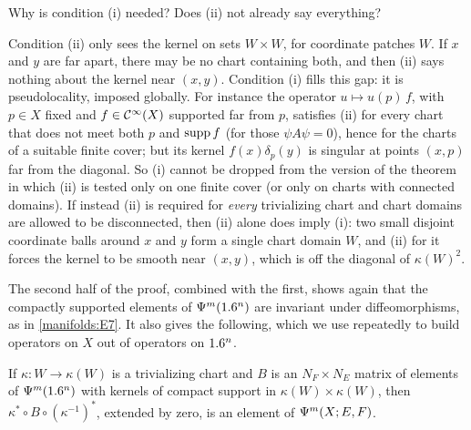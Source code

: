 \begin{question}
Why is condition (i) needed? Does (ii) not already say everything?
\end{question}
\begin{answer}
Condition (ii) only sees the kernel on sets $W\times W$, for coordinate
patches $W$. If $x$ and $y$ are far apart, there may be no chart containing
both, and then (ii) says nothing about the kernel near $(x,y)$. Condition (i)
fills this gap: it is pseudolocality, imposed globally. For instance the
operator $u\mapsto u(p)\,f$, with $p\in X$ fixed and $f\in\mathcal{C}^\infty(X)$ supported far
from $p$, satisfies (ii) for every chart that does not meet both $p$ and
$\operatorname{supp} f$ (for those $\psi A\psi=0$), hence for the charts of a suitable finite
cover; but its kernel
$f(x)\delta_p(y)$ is singular at points $(x,p)$ far from the diagonal.
So (i) cannot be dropped from the version of the theorem in which (ii) is tested
only on one finite cover (or only on charts with connected domains). If instead
(ii) is required for \emph{every} trivializing chart and chart domains are allowed
to be disconnected, then (ii) alone does imply (i): two small disjoint coordinate
balls around $x$ and $y$ form a single chart domain $W$, and (ii) for it forces the
kernel to be smooth near $(x,y)$, which is off the diagonal of $\kappa(W)^2$.
\end{answer}

The second half of the proof, combined with the first, shows again that the
compactly supported elements of $\Psi^{m}(1.6^n)$ are invariant under
diffeomorphisms, as in \ref{manifolds:E7}. It also gives the following, which
we use repeatedly to build operators on $X$ out of operators on $1.6^n$.

\begin{corollary}\label{manifolds:cor:local-ops}
If $\kappa:W\to\kappa(W)$ is a trivializing chart and $B$ is an
$N_F\times N_E$ matrix of elements of $\Psi^{m}(1.6^n)$ with kernels of compact
support in $\kappa(W)\times\kappa(W)$, then $\kappa^*\circ B\circ(\kappa^{-1})^*$,
extended by zero, is an element of $\Psi^{m}(X;E,F)$.
\end{corollary}

